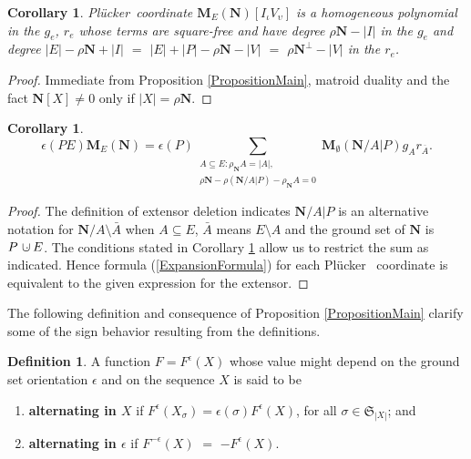 \documentclass[12pt]{article}
\newtheorem{corollary}[theorem]{Corollary}
\theoremstyle{definition}
\newtheorem{definition}[theorem]{Definition}
\newcommand{\dunion}
{\mbox{\hbox{\hskip6pt$\cdot$\hskip-5.50pt$\cup$\hskip2pt}}}
\newcommand{\scomp}[1]{\ensuremath{\overline{#1}}}
\newcommand{\Is}{\ensuremath{\iota}}
\newcommand{\Vs}{\ensuremath{\upsilon}}
\newcommand{\Perms}{\ensuremath{\mathfrak{S}}}
\newcommand{\rank}{{\rho}}%
\newcommand{\Rank}{{\rho}}%
\newcommand{\Card}[1]{\ensuremath{{\left|#1\right|}}}
\newcommand{\ext}[1]{\ensuremath{\mathbf{#1}}}
\newcommand{\Plucker}{Pl\"{u}cker\ }
\begin{document}
\begin{corollary}
\label{CorollaryHomoDegree}
\Plucker coordinate $\ext{M}_E(\ext{N})[I_{\Is}V_{\Vs}]$ is a homogeneous
polynomial in the $g_e$, $r_e$ whose terms are square-free and have
degree $\Rank{\ext{N}}-\Card{I}$ in the $g_e$ and degree 
$\Card{E}-\Rank{\ext{N}}+\Card{I}$ $=$ 
$\Card{E}+\Card{P}-\Rank{\ext{N}}-\Card{V}$
$=$ $\Rank{\ext{N}^{\perp}}-\Card{V}$ in the $r_e$.
\end{corollary}

\begin{proof}
Immediate from Proposition
\ref{PropositionMain}, matroid duality and the fact $\ext{N}[X]\neq 0$
only if $\Card{X}=\Rank{\ext{N}}$.
\end{proof}

\begin{corollary}
\label{corollaryMESubsetSum}
\begin{equation}
\label{MESubsetSum}
\epsilon(PE)\ext{M}_E(\ext{N})=\epsilon(P)\sum_
             {\begin{array}{c}
                A\subseteq E:
	\rank_{\ext{N}}{A}=\Card{A},\\
	\rank{\ext{N}}-\rank{(\ext{N}/A|P)}-
        \rank_{\ext{N}}{A}=0
               \end{array}}
    \ext{M}_\emptyset(\ext{N}/A|P) g_Ar_{\scomp{A}}.
\end{equation}
\end{corollary}

\begin{proof}

The definition of extensor deletion indicates 
$\ext{N}/A|P$ is an alternative notation
for $\ext{N}/A\setminus\bar{A}$ when $A\subseteq E$,
$\bar{A}$ means $E\setminus A$ and the
ground set of $\ext{N}$ is $P\dunion E$.  The conditions
stated in Corollary \ref{CorollaryHomoDegree}
allow us to restrict the sum as indicated.
Hence
formula (\ref{ExpansionFormula}) for each \Plucker
coordinate is equivalent to the given expression 
for the extensor.
\end{proof}


The following definition and consequence of 
Proposition \ref{PropositionMain} clarify some 
of the sign behavior resulting from the definitions.


\begin{definition}
A function $F=F^\epsilon(X)$ whose value might depend on
the ground set orientation $\epsilon$ and on the sequence $X$ is said to be
\begin{enumerate}
\item \textbf{alternating in $X$} if $F^\epsilon(X_\sigma) = 
\epsilon(\sigma)F^\epsilon(X)$, for all
$\sigma\in\Perms_{\Card{X}}$; and
\item \textbf{alternating in $\epsilon$} if $F^{-\epsilon}(X)$ $=$
$-F^\epsilon(X)$.
\end{enumerate}
\end{definition}
\end{document}
